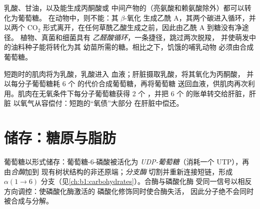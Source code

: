 \begin{proposition}[哪些物质能转化为葡萄糖]\label{prop:b1:biosyntheses-integration:cannot}
乳酸、甘油，以及能生成丙酮酸或
中间产物的（亮氨酸和赖氨酸除外）都可以转化为葡萄糖。
在动物中，则不能：其 $\beta$-氧化
生成乙酰 A，其两个碳进入循环，并以两个
$\mathrm{CO_2}$ 形式离开，在任何草酰乙酸生成之前，因此由乙酰 A 到糖没有净途径。
植物、真菌和细菌具有
\emph{乙醛酸循环}，一条捷径，跳过两次脱羧，
并使萌发中的油料种子能将转化为其
幼苗所需的糖。相比之下，饥饿的哺乳动物
必须由合成葡萄糖。
\end{proposition}

\begin{example}[科里循环]\label{ex:b1:biosyntheses-integration:cori}
短跑时的肌肉将为乳酸，乳酸进入
血液；肝脏摄取乳酸，将其氧化为丙酮酸，
并以每分子葡萄糖耗 6 个  的代价合成葡萄糖，再将葡萄糖
送回血液，供肌肉再次利用。肌肉在无氧条件下每分子葡萄糖获得
2 个 ，并把 6 个  的账单转交给肝脏，肝脏
以氧气从容偿付：短跑的“氧债”大部分
在肝脏中偿还。
\end{example}

\section{储存：糖原与脂肪}

\begin{definition}[糖原合成]\label{def:b1:biosyntheses-integration:glycogensynthesis}
葡萄糖以形式储存：葡萄糖-6-磷酸被活化为
\emph{UDP-葡萄糖}（消耗一个 UTP），再由\emph{合酶}加到
现有树状结构的非还原端；\emph{分支酶}
切割并重新连接短链，形成 $\alpha(1{\to}6)$
分支（见\cref{ch:b1:carbohydrates}）。合酶与磷酸化酶
受同一信号以相反方向调控：使磷酸化酶激活的
磷酸化修饰同时使合酶失活，
因此分子绝不会同时被合成与分解。
\end{definition}

